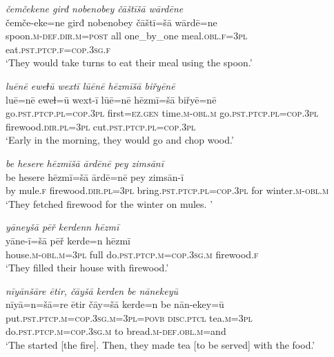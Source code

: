\ea \label{ŽE.29}
\textit{čemčekene girđ nobenobey čāštīšā wārdēne} \\ 
\gll čemče-eke=ne girđ nobenobey čāštī=šā wārdē=ne \\ 
 spoon\textsc{.m}\textsc{-def}\textsc{.dir}\textsc{.m}\textsc{=\textsc{post}} all one\_by\_one meal\textsc{.obl}\textsc{.f}\textsc{=3pl} eat\textsc{.pst}\textsc{.ptcp}\textsc{.f}\textsc{=cop}\textsc{.3sg}\textsc{.f} \\ 
\glt `They would take turns to eat their meal using the spoon.'
\z 
 
\ea \label{ŽE.33}
\textit{luēnē eweɫū wextī lūēnē hēzmīšā biřyēnē} \\ 
\gll luē=nē eweɫ=ū wext-ī lūē=nē hēzmī=šā biřyē=nē \\ 
 go\textsc{.pst}\textsc{.ptcp}\textsc{.pl}\textsc{=cop}\textsc{.3pl} first\textsc{\textsc{=ez.gen}} time\textsc{.m}\textsc{-obl}\textsc{.m} go\textsc{.pst}\textsc{.ptcp}\textsc{.pl}\textsc{=cop}\textsc{.3pl} firewood\textsc{.dir}\textsc{.pl}\textsc{=3pl} cut\textsc{.pst}\textsc{.ptcp}\textsc{.pl}\textsc{=cop}\textsc{.3pl} \\ 
\glt `Early in the morning, they would go and chop wood.'
\z 
 
\ea \label{ŽE.35}
\textit{be hesere hēzmīšā ārdēnē pey zimsānī} \\ 
\gll be hesere hēzmī=šā ārdē=nē pey zimsān-ī \\ 
 by mule\textsc{.f} firewood\textsc{.dir}\textsc{.pl}\textsc{=3pl} bring\textsc{.pst}\textsc{.ptcp}\textsc{.pl}\textsc{=cop}\textsc{.3pl} for winter\textsc{.m}\textsc{-obl}\textsc{.m} \\ 
\glt `They fetched firewood for the winter on mules. '
\z 
 
\ea \label{ŽE.36}
\textit{yāneyšā pēř kerdenn hēzmī} \\ 
\gll yāne-ī=šā pēř kerde=n hēzmī \\ 
 house\textsc{.m}\textsc{-obl}\textsc{.m}\textsc{=3pl} full do\textsc{.pst}\textsc{.ptcp}\textsc{.m}\textsc{=cop}\textsc{.3sg}\textsc{.m} firewood\textsc{.f} \\ 
\glt `They filled their house with firewood.'
\z 
 
\ea \label{ŽE.38}
\textit{nīyānšāre ētir, čāyšā kerden be nānekeyū} \\ 
\gll nīyā=n=šā=re ētir čāy=šā kerde=n be nān-ekey=ū \\ 
 put\textsc{.pst}\textsc{.ptcp}\textsc{.m}\textsc{=cop}\textsc{.3sg}\textsc{.m}\textsc{=3pl}\textsc{=\textsc{povb}} \textsc{disc}.\textsc{ptcl} tea\textsc{.m}\textsc{=3pl} do\textsc{.pst}\textsc{.ptcp}\textsc{.m}\textsc{=cop}\textsc{.3sg}\textsc{.m} to bread\textsc{.m}\textsc{-def}\textsc{.obl}\textsc{.m}=and \\ 
\glt `The started [the fire].  Then, they made tea [to be served] with the food.'
\z 
 
